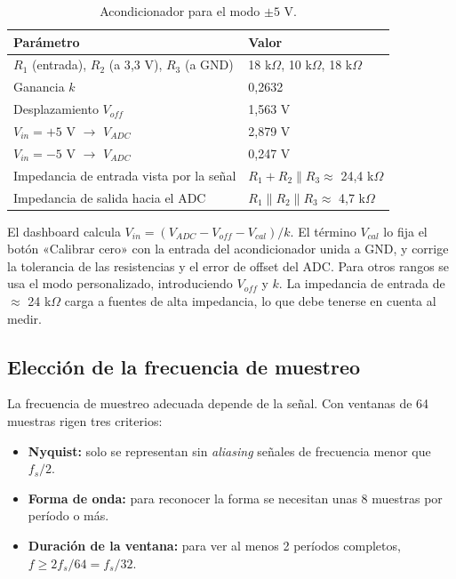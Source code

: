 \documentclass[12pt,a4paper]{article}
\begin{document}
\begin{table}[H]
\centering
\small
\begin{tabular}{@{}p{6.0cm} p{6.0cm}@{}}
\toprule
\textbf{Parámetro} & \textbf{Valor} \\
\midrule
$R_1$ (entrada), $R_2$ (a 3{,}3 V), $R_3$ (a GND) & 18 k$\Omega$, 10 k$\Omega$, 18 k$\Omega$ \\
Ganancia $k$ & 0{,}2632 \\
Desplazamiento $V_{off}$ & 1{,}563 V \\
$V_{in} = +5$ V $\rightarrow$ $V_{ADC}$ & 2{,}879 V \\
$V_{in} = -5$ V $\rightarrow$ $V_{ADC}$ & 0{,}247 V \\
Impedancia de entrada vista por la señal & $R_1 + R_2 \parallel R_3 \approx$ 24{,}4 k$\Omega$ \\
Impedancia de salida hacia el ADC & $R_1 \parallel R_2 \parallel R_3 \approx$ 4{,}7 k$\Omega$ \\
\bottomrule
\end{tabular}
\caption{Acondicionador para el modo $\pm 5$ V.}
\end{table}

El dashboard calcula $V_{in} = (V_{ADC} - V_{off} - V_{cal}) / k$. El término $V_{cal}$ lo fija el botón «Calibrar cero» con la entrada del acondicionador unida a GND, y corrige la tolerancia de las resistencias y el error de offset del ADC. Para otros rangos se usa el modo personalizado, introduciendo $V_{off}$ y $k$. La impedancia de entrada de $\approx$ 24 k$\Omega$ carga a fuentes de alta impedancia, lo que debe tenerse en cuenta al medir.

\subsection{Elección de la frecuencia de muestreo}

La frecuencia de muestreo adecuada depende de la señal. Con ventanas de 64 muestras rigen tres criterios:

\begin{itemize}
  \item \textbf{Nyquist:} solo se representan sin \emph{aliasing} señales de frecuencia menor que $f_s/2$.
  \item \textbf{Forma de onda:} para reconocer la forma se necesitan unas 8 muestras por período o más.
  \item \textbf{Duración de la ventana:} para ver al menos 2 períodos completos, $f \geq 2 f_s / 64 = f_s/32$.
\end{itemize}
\end{document}
